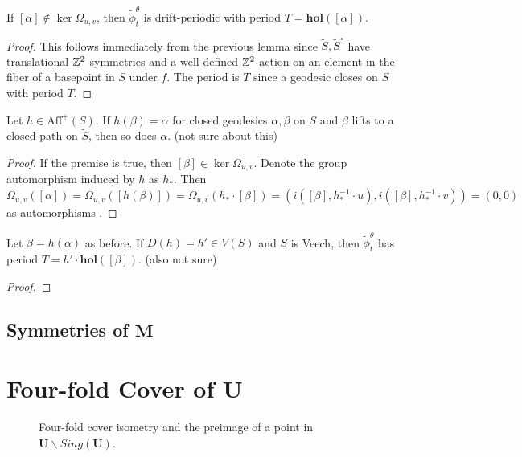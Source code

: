 \documentclass[]{article}
\def\hol{\mathbf{hol}}
\def\bM{\mathbf{M}}
\begin{document}
\begin{cor}
If $[\alpha]\notin\ker\Omega_{u,v}$, then $\tilde{\phi}_t^\theta$ is drift-periodic with period $T=\hol([\alpha])$.
\begin{proof}
This follows immediately from the previous lemma since $\tilde{S},\tilde{S}^\circ$ have translational $\mathbb{Z}^2$ symmetries and a well-defined $\mathbb{Z}^2$ action on an element in the fiber of a basepoint in $S$ under $f$. The period is $T$ since a geodesic closes on $S$ with period $T$.
\end{proof}
\end{cor}

\begin{lem}
Let $h\in\text{Aff}^+(S)$. If $h(\beta)=\alpha$ for closed geodesics $\alpha,\beta$ on $S$ and $\beta$ lifts to a closed path on $\tilde{S}$, then so does $\alpha$. (not sure about this)
\begin{proof}
If the premise is true, then $[\beta]\in\ker\Omega_{u,v}$. Denote the group automorphism induced by $h$ as $h_*$. Then $\Omega_{u,v}([\alpha])=\Omega_{u,v}([h(\beta)])=\Omega_{u,v}(h_*\cdot[\beta])=(i([\beta],h_*^{-1}\cdot u),i([\beta],h_*^{-1}\cdot v))=(0,0)$ as automorphisms .
\end{proof}
\end{lem}

\begin{lem}
Let $\beta=h(\alpha)$ as before. If $D(h)=h'\in V(S)$ and $S$ is Veech, then $\tilde{\phi}^\theta_t$ has period $T=h'\cdot\hol([\beta])$. (also not sure)
\begin{proof}

\end{proof}
\end{lem}



\subsection{Symmetries of $\bM$}



\section{Four-fold Cover of $\mathbf{U}$}

\begin{figure}[H]
\centering
\hspace{0.5in}
\caption{Four-fold cover isometry and the preimage of a point in $\mathbf U \backslash Sing(\mathbf U)$.}
\end{figure}
\end{document}

